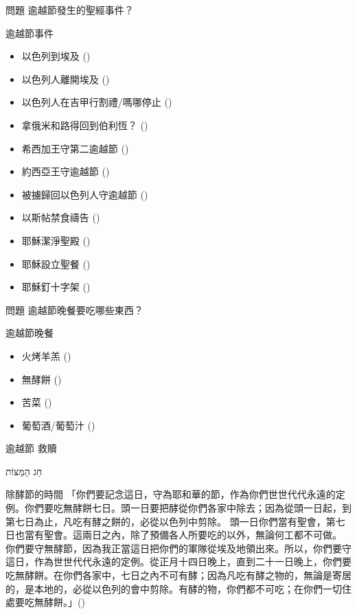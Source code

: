 \documentclass{beamer}
\newcommand{\topic}[1]{
\begin{frame}
    \centering
    \vspace*{1cm}
    {\fontsize{40}{48}\selectfont #1\par}
    \vfill
\end{frame}
}
\newcommand{\question}[1]{
\begin{frame}{問題}
    \centering
    \vspace*{1cm}
    \huge #1？\par
    \vfill
\end{frame}
}
\newcommand{\conclusion}[2]{
\begin{frame}
    \centering
    \vspace*{1cm}
    {\fontsize{40}{48}\selectfont #1 \textemdash #2\par}
    \vfill
\end{frame}
}
\newcommand{\parvspace}{\par\vspace{0.5em}}
\begin{document}
\question{逾越節發生的聖經事件}

\begin{frame}{逾越節事件}
	\begin{itemize}
		\item 以色列到埃及 ()
		\item 以色列人離開埃及 ()
		\item 以色列人在吉甲行割禮/嗎哪停止 ()
		\item 拿俄米和路得回到伯利恆？ ()
		\item 希西加王守第二逾越節 ()
		\item 約西亞王守逾越節 ()
		\item 被擄歸回以色列人守逾越節 ()
		\item 以斯帖禁食禱告 ()
		\item 耶穌潔淨聖殿 ()
		\item 耶穌設立聖餐 ()
		\item 耶穌釘十字架 ()
	\end{itemize}
\end{frame}

\question{逾越節晚餐要吃哪些東西}

\begin{frame}{逾越節晚餐}
	\begin{itemize}
		\item 火烤羊羔 ()
		\item 無酵餅 ()
		\item 苦菜 ()
		\item 葡萄酒/葡萄汁 ()
	\end{itemize}
\end{frame}

\conclusion{逾越節}{救贖}

\topic{\texthebrew{חַג הַמַּצּוֹת}}

\begin{frame}{除酵節的時間}
	「你們要記念這日，守為耶和華的節，作為你們世世代代永遠的定例。\alert{你們要吃無酵餅七日。頭一日要把酵從你們各家中除去}；因為從頭一日起，到第七日為止，凡吃有酵之餅的，必從以色列中剪除。 \alert{頭一日你們當有聖會，第七日也當有聖會}。這兩日之內，除了預備各人所要吃的以外，無論何工都不可做。 \alert{你們要守無酵節，因為我正當這日把你們的軍隊從埃及地領出來}。所以，你們要守這日，作為世世代代永遠的定例。從\alert{正月十四日晚上，直到二十一日晚上}，你們要吃無酵餅。在你們各家中，七日之內不可有酵；因為凡吃有酵之物的，無論是寄居的，是本地的，必從以色列的會中剪除。有酵的物，你們都不可吃；在你們一切住處要吃無酵餅。」()\parvspace
\end{frame}
\end{document}
